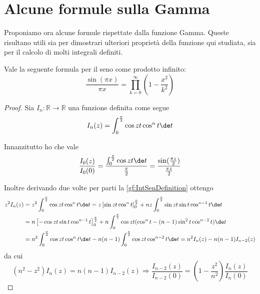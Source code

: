 \section{Alcune formule sulla Gamma}
Proponiamo ora alcune formule rispettate dalla funzione Gamma. Queste risultano utili sia per dimostrari ulteriori proprietà della
funzione qui studiata, sia per il calcolo di molti integrali definiti.

\begin{lemma} \label{gf:ProdottoSeno}
	Vale la seguente formula per il seno come prodotto infinito:
	\begin{equation*}
		\frac{\sin (\pi x)}{\pi x}=\prod_{k=0}^{\infty} \left(1-\frac{x^2}{ k^2}\right)
	\end{equation*}
\end{lemma}
\begin{proof}
	Sia $I_n:\mathbb{R}\to\mathbb{R}$ una funzione definita come segue
	\begin{equation} \label{gf:IntSenDefinition}
		I_n(z)=\int_0^{\frac{\pi}2}{\cos{zt}\cos^nt \de t}
	\end{equation}
	
	Innanzitutto ho che vale
	\begin{equation}\label{gf:SenRis1}
		\frac{I_0(z)}{I_0(0)}=\frac{\int_0^{\frac{\pi}2}{\cos{zt} \de t}}{\frac{\pi}2}=\frac{\sin(\frac {\pi z} 2)}{\frac {\pi z} 2}
	\end{equation}
	
	Inoltre derivando due volte per parti la \cref{gf:IntSenDefinition} ottengo
	\begin{align*}
		z^2 I_n(z) 	& =z^2 \int_0^{\frac{\pi}2}{\cos{zt}\cos^nt \de t}=z\left[ \sin{zt}\cos^nt \right]_0^{\frac{\pi}2}+nz\int_0^{\frac{\pi}2}{\sin{zt}\sin t\cos^{n-1}t \de t} \\
					& =n\left[ -\cos{zt}\sin t\cos^{n-1}t \right]_0^{\frac{\pi}2}+n\int_0^{\frac{\pi}2}{\cos{zt}(\cos^nt-(n-1)\sin^2t\cos^{n-2}t )\de t} \\
					& =n^2 \int_0^{\frac{\pi}2}{\cos{zt}\cos^nt \de t} -n(n-1) \int_0^{\frac{\pi}2}{\cos{zt}\cos^{n-2}t \de t}=n^2 I_n(z)-n(n-1) I_{n-2}(z)
	\end{align*}
	da cui 
	\begin{equation} \label{gf:SenRis2}
		(n^2-z^2)I_n(z)=n(n-1)I_{n-2}(z) \Longrightarrow \frac{I_{n-2}(z)}{I_{n-2}(0)}=\left( 1-\frac{z^2}{n^2} \right) \frac{I_n(z)}{I_n(0)}
	\end{equation}
	

\end{proof}
